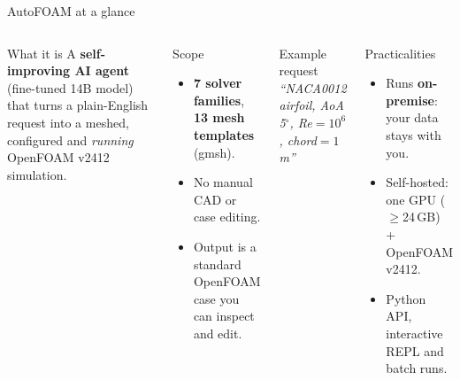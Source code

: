 \documentclass[aspectratio=169,10pt]{beamer}
\begin{document}
\begin{frame}{AutoFOAM at a glance}
\begin{columns}[T,onlytextwidth]
\begin{block}{What it is}
\small A \textbf{self-improving AI agent} (fine-tuned 14B model) that turns a plain-English request into a meshed, configured and \emph{running} OpenFOAM v2412 simulation.
\end{block}
\begin{block}{Scope}
\small
\begin{itemize}
  \item \textbf{7 solver families}, \textbf{13 mesh templates} (gmsh).
  \item No manual CAD or case editing.
  \item Output is a standard OpenFOAM case you can inspect and edit.
\end{itemize}
\end{block}
\begin{exampleblock}{Example request}
\small\itshape``NACA0012 airfoil, AoA 5$^\circ$, Re$=10^6$, chord$=1$\,m''
\end{exampleblock}
\begin{block}{Practicalities}
\small
\begin{itemize}
  \item Runs \textbf{on-premise}: your data stays with you.
  \item Self-hosted: one GPU ($\ge$24\,GB) + OpenFOAM v2412.
  \item Python API, interactive REPL and batch runs.
\end{itemize}
\end{block}
\end{columns}
\end{frame}
\end{document}
